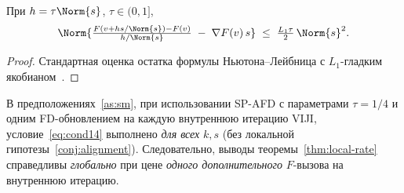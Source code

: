 \begin{lemma}
\label{lem:fd}
При $h = \tau \Norm{s}$, $\tau \in (0, 1]$,
\[
\Norm{\tfrac{F(v + h s/\Norm{s}) - F(v)}{h/\Norm{s}} \;-\; \nabla F(v)\, s}
\;\le\; \tfrac{L_1 \tau}{2}\,\Norm{s}^2.
\]
\end{lemma}

\begin{proof}
Стандартная оценка остатка формулы Ньютона--Лейбница с $L_1$-гладким
якобианом~\cite[Lemma~4.1.12]{dennis1996}.
\end{proof}

\begin{theorem}
\label{thm:sp-afd}
В предположениях~\ref{as:sm}, при использовании SP-AFD с параметрами
$\tau = 1/4$ и одним FD-обновлением на каждую внутреннюю итерацию
VIJI, условие~\eqref{eq:cond14} выполнено \emph{для всех} $k, s$
(без локальной гипотезы~\ref{conj:alignment}). Следовательно, выводы
теоремы~\ref{thm:local-rate} справедливы \emph{глобально}
при цене \emph{одного дополнительного} $F$-вызова на внутреннюю итерацию.
\end{theorem}

